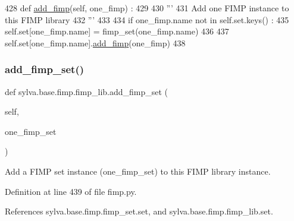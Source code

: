 \begin{DoxyCode}
428     \textcolor{keyword}{def }\hyperlink{namespacesylva_1_1base_1_1fimp_a33d5ea52e7780ea1d4f0df718eab4ff2}{add\_fimp}(self, one\_fimp) :
429 
430       \textcolor{stringliteral}{'''}
431 \textcolor{stringliteral}{        Add one FIMP instance to this FIMP library}
432 \textcolor{stringliteral}{      '''}
433 
434       \textcolor{keywordflow}{if} one\_fimp.name \textcolor{keywordflow}{not} \textcolor{keywordflow}{in} self.set.keys() :
435         self.set[one\_fimp.name] = fimp\_set(one\_fimp.name)
436 
437       self.set[one\_fimp.name].\hyperlink{namespacesylva_1_1base_1_1fimp_a33d5ea52e7780ea1d4f0df718eab4ff2}{add\_fimp}(one\_fimp)
438 
\end{DoxyCode}
\mbox{\label{classsylva_1_1base_1_1fimp_1_1fimp__lib_a9002e9b5d1e1b6cef2787996398c443e}} 
\subsubsection{\texorpdfstring{add\+\_\+fimp\+\_\+set()}{add\_fimp\_set()}}
{\footnotesize\ttfamily def sylva.\+base.\+fimp.\+fimp\+\_\+lib.\+add\+\_\+fimp\+\_\+set (\begin{DoxyParamCaption}\item[{}]{self,  }\item[{}]{one\+\_\+fimp\+\_\+set }\end{DoxyParamCaption})}

\begin{DoxyVerb}  Add a FIMP set instance (one_fimp_set) to this FIMP library instance.
\end{DoxyVerb}
 

Definition at line 439 of file fimp.\+py.



References sylva.\+base.\+fimp.\+fimp\+\_\+set.\+set, and sylva.\+base.\+fimp.\+fimp\+\_\+lib.\+set.


